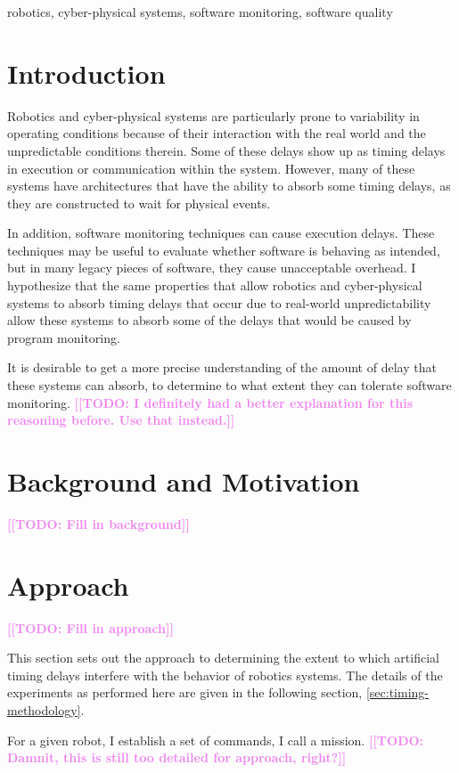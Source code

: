 \documentclass[conference]{IEEEtran}
\newcommand{\todo}[1]{\textcolor{violet}{{\bfseries [[TODO: #1]]}}}
\begin{document}
\begin{IEEEkeywords}
robotics, cyber-physical systems, software monitoring, software quality
\end{IEEEkeywords}

\section{Introduction}
Robotics and cyber-physical systems are particularly prone to variability in operating conditions because of their interaction with the real world and the unpredictable conditions therein. Some of these delays show up as timing delays in execution or communication within the system. However, many of these systems have architectures that have the ability to absorb some timing delays, as they are constructed to wait for physical events.

In addition, software monitoring techniques can cause execution delays. These techniques may be useful to evaluate whether software is behaving as intended, but in many legacy pieces of software, they cause unacceptable overhead. I hypothesize that the same properties that allow robotics and cyber-physical systems to absorb timing delays that occur due to real-world unpredictability allow these systems to absorb some of the delays that would be caused by program monitoring.

It is desirable to get a more precise understanding of the amount of delay that these systems can absorb, to determine to what extent they can tolerate software monitoring.
\todo{I definitely had a better explanation for this reasoning before. Use that instead.}


\section{Background and Motivation}
\label{sec:background}
\todo{Fill in background}

\section{Approach}
\label{sec:approach}
\todo{Fill in approach}

This section sets out the approach to determining the extent to which artificial timing delays interfere with the behavior of robotics systems.
The details of the experiments as performed here are given in the following
section, \ref{sec:timing-methodology}.

For a given robot, I establish a set of commands, I call a mission. \todo{Damnit, this is still too detailed for approach, right?}
\end{document}
